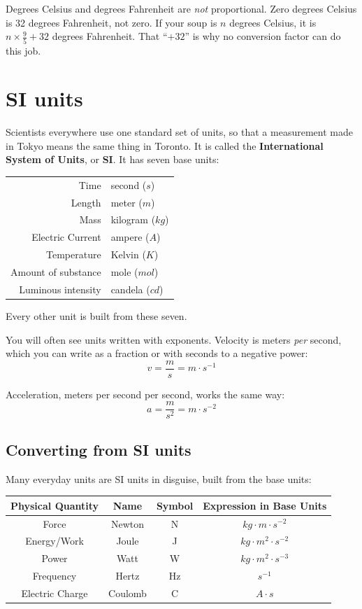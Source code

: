 Degrees Celsius and degrees Fahrenheit are \textit{not} proportional. Zero degrees Celsius is 32 degrees Fahrenheit, not zero. If your soup is $n$ degrees Celsius, it is $n \times
\frac{9}{5} + 32$ degrees Fahrenheit. That ``$+ 32$'' is why no conversion factor can do this job.

\section{SI units}
Scientists everywhere use one standard set of units, so that a measurement made in Tokyo means the same thing in Toronto. It is called the \textbf{International System of Units}, or \textbf{SI}. It has seven base units:

\begin{tabular}{r | l}
Time  & second ($s$) \\
Length  & meter ($m$)\\
Mass  & kilogram ($kg$)\\
Electric Current  & ampere ($A$)\\
Temperature  & Kelvin\index{Kelvin} ($K$)\\
Amount of substance  &  mole ($mol$)\\
Luminous intensity  & candela ($cd$)\\
\end{tabular}

Every other unit is built from these seven.


You will often see units written with exponents. Velocity is meters \textit{per} second, which you can write as a fraction or with seconds to a negative power:
$$v = \dfrac{m}{s} = m \cdot s^{-1}$$

Acceleration, meters per second per second, works the same way:
$$a = \dfrac{m}{s^2} = m \cdot s^{-2}$$

\subsection{Converting from SI units}
Many everyday units are SI units in disguise, built from the base units:

\begin{table}[!ht]
    \centering
    \begin{tabular}{|c|c|c|c|}
    \hline
        Physical Quantity & Name & Symbol & Expression in Base Units \\ \hline
        Force & Newton & N & $kg\cdot m\cdot s^{-2}$ \\ \hline
        Energy/Work & Joule & J & $kg\cdot m^2\cdot s^{-2}$ \\ \hline
        Power & Watt & W & $kg\cdot m^2\cdot s^{-3}$ \\ \hline
        Frequency & Hertz & Hz & $s^{-1}$ \\ \hline
        Electric Charge & Coulomb & C & $A\cdot s$ \\ \hline
    \end{tabular}
\end{table}

